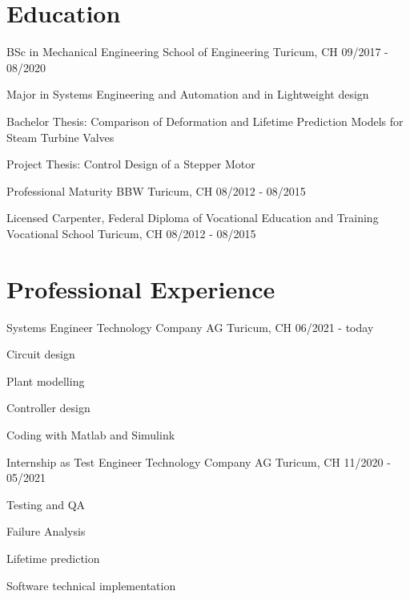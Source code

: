 \documentclass[rightPos]{ReCeiVe}      %
\begin{document}
\makecvheader[L]
\makecvsidebar

\vspace{-\acvSectionTopSkip}
\section{Education}
\cventry
{BSc in Mechanical Engineering} %
{School of Engineering} %
{Turicum, CH} %
{09/2017 - 08/2020} %
\begin{cvitems}
\item {Major in Systems Engineering and Automation and in Lightweight design}
\item {Bachelor Thesis: Comparison of Deformation and Lifetime Prediction Models for Steam Turbine Valves}
\item {Project Thesis: Control Design of a Stepper Motor}
\end{cvitems}

\cventry
{Professional Maturity} %
{BBW} %
{Turicum, CH} %
{08/2012 - 08/2015} %

\cventry
{Licensed Carpenter, Federal Diploma of Vocational Education and Training} %
{Vocational School} %
{Turicum, CH} %
{08/2012 - 08/2015} %


\section{Professional Experience}
\cventry
{Systems Engineer} %
{Technology Company AG} %
{Turicum, CH} %
{06/2021 - today} %
\begin{cvitems}
\item {Circuit design}
\item {Plant modelling}
\item {Controller design}
\item {Coding with Matlab and Simulink}
\end{cvitems}

\cventry
{Internship as Test Engineer} %
{Technology Company AG} %
{Turicum, CH} %
{11/2020 - 05/2021} %
\begin{cvitems}
\item {Testing and QA}
\item {Failure Analysis}
\item {Lifetime prediction}
\item {Software technical implementation}
\end{cvitems}
\end{document}
